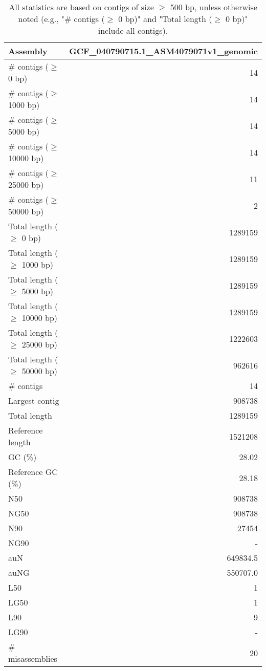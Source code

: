 \documentclass[12pt,a4paper]{article}
\begin{document}
\begin{table}[ht]
\begin{center}
\caption{All statistics are based on contigs of size $\geq$ 500 bp, unless otherwise noted (e.g., "\# contigs ($\geq$ 0 bp)" and "Total length ($\geq$ 0 bp)" include all contigs).}
\begin{tabular}{|l*{1}{|r}|}
\hline
Assembly & GCF\_040790715.1\_ASM4079071v1\_genomic \\ \hline
\# contigs ($\geq$ 0 bp) & 14 \\ \hline
\# contigs ($\geq$ 1000 bp) & 14 \\ \hline
\# contigs ($\geq$ 5000 bp) & 14 \\ \hline
\# contigs ($\geq$ 10000 bp) & 14 \\ \hline
\# contigs ($\geq$ 25000 bp) & 11 \\ \hline
\# contigs ($\geq$ 50000 bp) & 2 \\ \hline
Total length ($\geq$ 0 bp) & 1289159 \\ \hline
Total length ($\geq$ 1000 bp) & 1289159 \\ \hline
Total length ($\geq$ 5000 bp) & 1289159 \\ \hline
Total length ($\geq$ 10000 bp) & 1289159 \\ \hline
Total length ($\geq$ 25000 bp) & 1222603 \\ \hline
Total length ($\geq$ 50000 bp) & 962616 \\ \hline
\# contigs & 14 \\ \hline
Largest contig & 908738 \\ \hline
Total length & 1289159 \\ \hline
Reference length & 1521208 \\ \hline
GC (\%) & 28.02 \\ \hline
Reference GC (\%) & 28.18 \\ \hline
N50 & 908738 \\ \hline
NG50 & 908738 \\ \hline
N90 & 27454 \\ \hline
NG90 & - \\ \hline
auN & 649834.5 \\ \hline
auNG & 550707.0 \\ \hline
L50 & 1 \\ \hline
LG50 & 1 \\ \hline
L90 & 9 \\ \hline
LG90 & - \\ \hline
\# misassemblies & 20 \\ \hline

\end{tabular}
\end{center}
\end{table}
\end{document}
